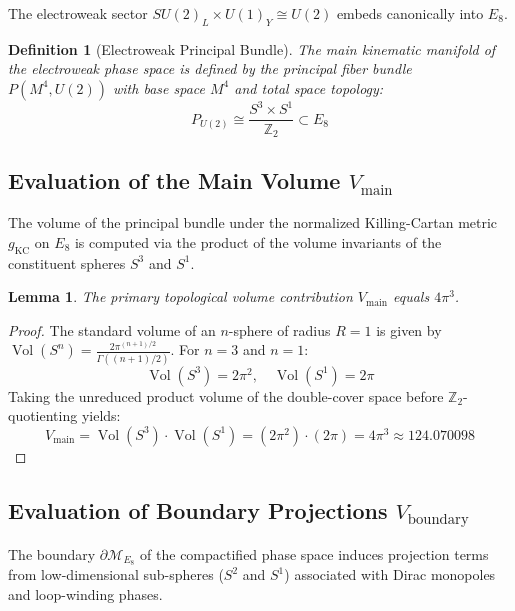 \documentclass[11pt,a4paper]{article}
\newtheorem{lemma}[theorem]{Lemma}
\newtheorem{definition}{Definition}
\begin{document}
The electroweak sector $SU(2)_L \times U(1)_Y \cong U(2)$ embeds canonically into $E_8$.

\begin{definition}[Electroweak Principal Bundle]
The main kinematic manifold of the electroweak phase space is defined by the principal fiber bundle $P(M^4, U(2))$ with base space $M^4$ and total space topology:
\begin{equation}
    P_{U(2)} \cong \frac{S^3 \times S^1}{\mathbb{Z}_2} \subset E_8
\end{equation}
\end{definition}

\subsection{Evaluation of the Main Volume $V_{\text{main}}$}

The volume of the principal bundle under the normalized Killing-Cartan metric $g_{\text{KC}}$ on $E_8$ is computed via the product of the volume invariants of the constituent spheres $S^3$ and $S^1$.

\begin{lemma}
The primary topological volume contribution $V_{\text{main}}$ equals $4\pi^3$.
\end{lemma}
\begin{proof}
The standard volume of an $n$-sphere of radius $R=1$ is given by $\operatorname{Vol}(S^n) = \frac{2\pi^{(n+1)/2}}{\Gamma((n+1)/2)}$. For $n=3$ and $n=1$:
\begin{equation}
    \operatorname{Vol}(S^3) = 2\pi^2, \quad \operatorname{Vol}(S^1) = 2\pi
\end{equation}
Taking the unreduced product volume of the double-cover space before $\mathbb{Z}_2$-quotienting yields:
\begin{equation}
    V_{\text{main}} = \operatorname{Vol}(S^3) \cdot \operatorname{Vol}(S^1) = (2\pi^2) \cdot (2\pi) = 4\pi^3 \approx 124.070098
\end{equation}
\end{proof}

\subsection{Evaluation of Boundary Projections $V_{\text{boundary}}$}

The boundary $\partial \mathcal{M}_{E_8}$ of the compactified phase space induces projection terms from low-dimensional sub-spheres ($S^2$ and $S^1$) associated with Dirac monopoles and loop-winding phases.
\end{document}
